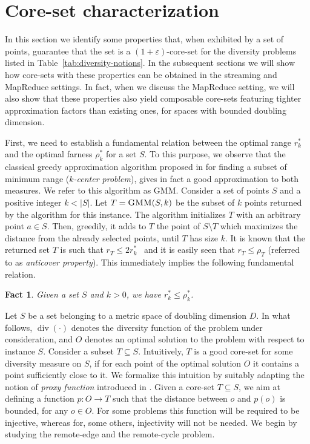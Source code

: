 \documentclass{article}
\newtheorem{fact}{Fact}
\DeclareMathOperator{\diversity}{div}
\renewcommand{\epsilon}{\varepsilon}
\begin{document}
\section{Core-set characterization}\label{sec:basic-properties}

In this section we identify some properties that, when exhibited by a
set of points, guarantee that the set is a $(1+\epsilon)$-core-set for
the diversity problems listed in Table~\ref{tab:diversity-notions}. In
the subsequent sections we will show how core-sets with these
properties can be obtained in the streaming and MapReduce settings. In
fact, when we discuss the MapReduce setting, we will also show that
these properties also yield composable core-sets featuring tighter
approximation factors than existing ones, for spaces
with bounded doubling dimension.

First, we need to establish a fundamental relation between the optimal
range $r_k^*$ and the optimal farness $\rho_k^*$ for a set $S$.  To
this purpose, we observe that the classical greedy approximation
algorithm proposed in \cite{Gonzalez85} for finding a subset of
minimum range (\emph{$k$-center problem}), gives in fact a good
approximation to both measures. We refer to this algorithm as {\sc
  GMM}.  Consider a set of points $S$ and a positive integer $k <
|S|$. Let $T=\mbox{\sc GMM}(S,k)$ be the subset of $k$ points returned
by the algorithm for this instance. The algorithm initializes $T$ with
an arbitrary point $a\in S$. Then, greedily, it adds to $T$ the point
of $S\setminus T$ which maximizes the distance from the already
selected points, until $T$ has size $k$.  It is known that the
returned set $T$ is such that $r_T \leq 2 r_k^*$~\cite{Gonzalez85} and
it is easily seen that $r_T \leq \rho_T$ (referred to as
\emph{anticover property}). This immediately implies the following
fundamental relation.
\begin{fact}\label{fact:opt-radius-farness}
Given a set $S$ and $k>0$, we have $r_k^* \le
  \rho_k^*$.
\end{fact}

Let $S$ be a set belonging to a metric space of doubling dimension
$D$. In what follows, $\diversity(\cdot)$ denotes the diversity
function of the problem under consideration, and $O$ denotes an
optimal solution to the problem with respect to instance $S$.
Consider a subset $T\subseteq S$. Intuitively, $T$ is a good core-set
for some diversity measure on $S$, if for each point of the optimal
solution $O$ it contains a point sufficiently close to it.  We
formalize this intuition by suitably adapting the notion of
\emph{proxy function} introduced in \cite{IndykMMM14}. Given a
core-set $T\subseteq S$, we aim at defining a function
$p: O \rightarrow T$ such that the distance between $o$ and $p(o)$ is
bounded, for any $o\in O$. For some problems this function will be
required to be injective, whereas for, some others, injectivity will not
be needed. We begin by studying the remote-edge and the remote-cycle problem.
\end{document}
